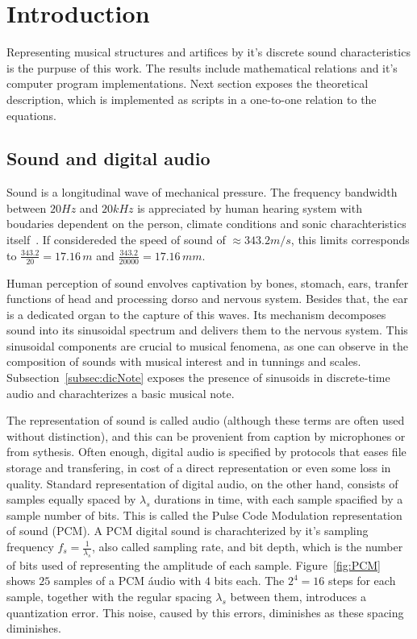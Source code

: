 \documentclass[
 aip,
 jmp,
 amsmath,amssymb,
 reprint,
]{revtex4-1}
\begin{document}
\section{\label{sec:level1}Introduction}

Representing musical structures and artifices by it's discrete sound characteristics is the purpuse of this work. The results include mathematical relations and it's computer program implementations. Next section exposes the theoretical description, which is implemented as scripts in a one-to-one relation to the equations.

\subsection{Sound and digital audio}

Sound is a longitudinal wave of mechanical pressure. The frequency bandwidth between $20Hz$ and $20kHz$ is appreciated by human hearing system with boudaries dependent on the person, climate conditions and sonic charachteristics itself~\cite{Roederer}. If considereded the speed of sound of $\approx 343.2 m/s$, this limits corresponds to $\frac{343.2}{20} = 17.16\,m$ and $\frac{343.2}{20000}=17.16\,mm$.

Human perception of sound envolves captivation by bones, stomach, ears, tranfer functions of head and processing dorso and nervous system. Besides that, the ear is a dedicated organ to the capture of this waves. Its mechanism decomposes sound into its sinusoidal spectrum and delivers them to the nervous system. This sinusoidal components are crucial to musical fenomena, as one can observe in the composition of sounds with musical interest and in tunnings and scales. Subsection~\ref{subsec:dicNote} exposes the presence of sinusoids in discrete-time audio and charachterizes a basic musical note.

The representation of sound is called audio (although these terms are often used without distinction), and this can be provenient from caption by microphones or from sythesis. Often enough, digital audio is specified by protocols that eases file storage and transfering, in cost of a direct representation or even some loss in quality. Standard representation of digital audio, on the other hand, consists of samples equally spaced by $\lambda_s$ durations in time, with each sample spacified by a sample number of bits. This is called the Pulse Code Modulation representation of sound (PCM). A PCM digital sound is charachterized by it's sampling frequency $f_s=\frac{1}{\lambda_s}$, also called sampling rate, and bit depth, which is the number of bits used of representing the amplitude of each sample. Figure~\ref{fig:PCM} shows $25$ samples of a PCM áudio with $4$ bits each. The $2^4=16$ steps for each sample, together with the regular spacing $\lambda_s$ between them, introduces a quantization error. This noise, caused by this errors, diminishes as these spacing diminishes.
\end{document}
